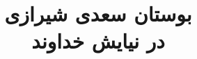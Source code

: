 \documentclass[14pt,b5paper]{article}
\begin{document}
\title{\Huge بوستان سعدی شیرازی \\
در نیایش خداوند}
\author{ }
\date{ }
\maketitle
\newpage
\tableofcontents
\newpage

\newpage

\newpage

\newpage

\newpage

\newpage

\newpage
\end{document}
